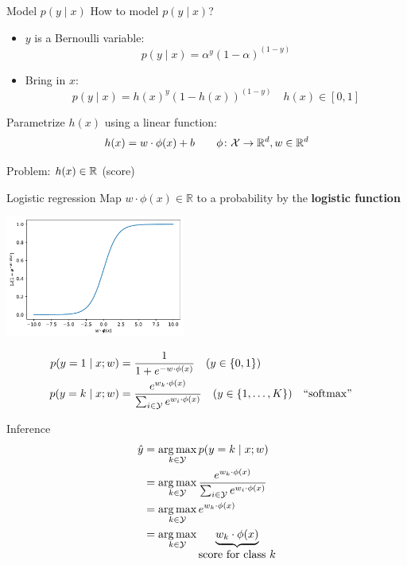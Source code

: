 \documentclass[usenames,dvipsnames,notes,11pt,aspectratio=169]{beamer}
\newcommand{\pdfnote}[1]{}
\begin{document}
\begin{frame}
    {Model $p(y\mid x)$}
    How to model $p(y\mid x)$?
    \begin{itemize}
        \item[] $y$ is a Bernoulli variable:
            $$
            p(y\mid x) = \alpha^y (1-\alpha)^{(1-y)}
            $$
            \pause
        \item[] Bring in $x$:
            $$
            p(y\mid x) = h(x)^y (1-h(x))^{(1-y)} \quad h(x) \in [0,1]
            $$
    \end{itemize}

    \medskip\pause
    Parametrize $h(x)$ using a linear function:\\
    $$
    h(x) = w\cdot \phi(x) + b \quad\quad \phi\colon \mathcal{X} \rightarrow \mathbb{R}^d, w\in\mathbb{R}^d
    $$

    Problem: $h(x) \in \mathbb{R}$ (score)
\end{frame}

\begin{frame}
    {Logistic regression}
    Map $w\cdot\phi(x) \in\mathbb{R}$ to a probability by the \textbf{logistic function}
    \vspace{-1em}
    \begin{center}
        \includegraphics[height=4cm]{figures/logistic}
    \end{center}
    \vspace{-2em}
    \begin{align*}
    p(y=1\mid x; w) &= \frac{1}{1 + e^{-w\cdot\phi(x)}} \quad (y\in \left\{ 0,1 \right\})\\
        p(y=k\mid x; w) &= \frac{e^{w_k\cdot\phi(x)}}{\sum_{i\in\mathcal{Y}}e^{w_i\cdot\phi(x)}} \quad (y\in \left\{ 1, \ldots, K \right\}) && \text{``softmax''}
    \end{align*}
    \pdfnote{
        Note that in multiclass classification setting, there is one $w$ for each class.
    }
\end{frame}

\begin{frame}
    {Inference}
    \begin{align}
        \hat{y} &= \operatorname*{arg\,max}_{k\in\mathcal{Y}} p(y=k\mid x; w) \\
        &= \operatorname*{arg\,max}_{k\in\mathcal{Y}} \frac{e^{w_k\cdot\phi(x)}}{\sum_{i\in\mathcal{Y}}e^{w_i\cdot\phi(x)}} \\
        &= \operatorname*{arg\,max}_{k\in\mathcal{Y}} e^{w_k\cdot\phi(x)} \\
        &= \operatorname*{arg\,max}_{k\in\mathcal{Y}} \underbrace{w_k\cdot\phi(x)}_{\textstyle\text{score for class $k$}}
    \end{align}
\end{frame}
\end{document}
